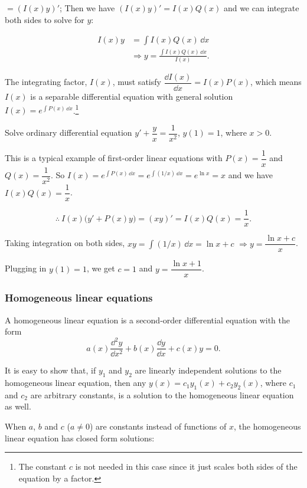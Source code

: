 
$=(I(x)y)'$; Then we have $(I(x)y)'=I(x)Q(x)$ and we can integrate both sides to solve
for $y$:

\[
\begin{aligned}
I(x)y&=\int I(x)Q(x)\,\dd x\\
&\Rightarrow y=\frac{\int I(x)Q(x)\,\dd x}{I(x)}.
\end{aligned}
\]

The integrating factor, $I(x)$, must satisfy
$\dfrac{\dd I(x)}{\dd x}=I(x)P(x)$, which means $I(x)$ is a separable differential equation
with general solution $I(x)=e^{\int P(x)\,\dd x}$.\footnote[8]{The constant $c$ is not needed in this case since it just scales both sides of the equation by a factor.}

\begin{problem}{Solve ordinary differential equation $y'+\dfrac{y}{x}=\dfrac{1}{x^2}$, $y(1)=1$, where $x>0$.}
\end{problem}
\begin{solution}
This is a typical example of first-order linear equations with $P(x)=\dfrac{1}{x}$ and
$Q(x)=\dfrac{1}{x^2}$. So $I(x)=e^{\int P(x)\,\dd x}=e^{\int(1/x)\,\dd x}=e^{\ln x}=x$
and we have $I(x)Q(x)=\dfrac{1}{x}$.

\[
\therefore\ I(x)\bigl(y'+P(x)y\bigr)=(xy)'=I(x)Q(x)=\frac{1}{x}.
\]

Taking integration on both sides, $xy=\int(1/x)\,\dd x=\ln x+c$
$\Rightarrow y=\dfrac{\ln x+c}{x}$.

Plugging in $y(1)=1$, we get $c=1$ and $y=\dfrac{\ln x+1}{x}$.
\end{solution}

\subsubsection*{Homogeneous linear equations}

A homogeneous linear equation is a second-order differential equation with the form
\[
a(x)\frac{\dd^2y}{\dd x^2}+b(x)\frac{\dd y}{\dd x}+c(x)y=0.
\]

It is easy to show that, if $y_1$ and $y_2$ are linearly independent solutions to the
homogeneous linear equation, then any $y(x)=c_1y_1(x)+c_2y_2(x)$, where $c_1$ and
$c_2$ are arbitrary constants, is a solution to the homogeneous linear equation as well.

When $a$, $b$ and $c$ ($a\ne0$) are constants instead of functions of $x$, the homogeneous
linear equation has closed form solutions:


